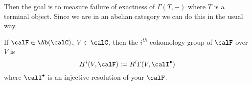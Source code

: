 \documentclass[12pt]{article}
\begin{document}
Then the goal is to measure failure of exactness of $\Gamma(T,-)$ where $T$ is a terminal object. Since we are in an abelian category we can do this in the usual way.

\begin{defn}
	If $\calF\in\Ab(\calC)$, $V\in \calC$, then the $i^{th}$ cohomology group of $\calF$ over $V$ is 
	\[H^i(V,\calF):=R^i\Gamma(V,\calI^\bullet)\]
	where $\calI^\bullet$ is an injective resolution of your $\calF$.
\end{defn}


\newpage
\end{document}
